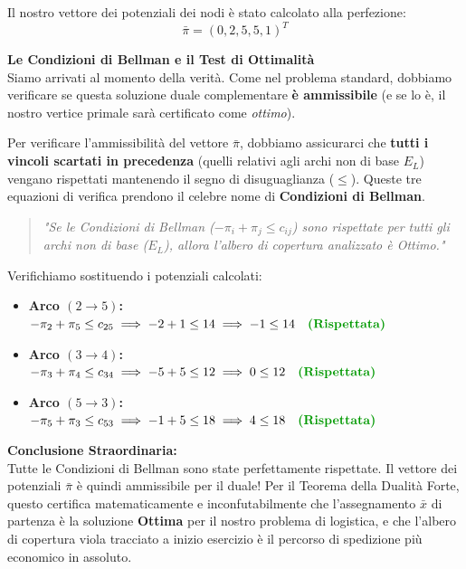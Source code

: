 \documentclass[12pt, a4paper]{article}
\begin{document}
	Il nostro vettore dei potenziali dei nodi è stato calcolato alla perfezione:
	\[ \bar{\pi} = (0, 2, 5, 5, 1)^T \]
	
	\vspace{0.4cm}
	\textbf{Le Condizioni di Bellman e il Test di Ottimalità}\\
	Siamo arrivati al momento della verità. Come nel problema standard, dobbiamo verificare se questa soluzione duale complementare \textbf{è ammissibile} (e se lo è, il nostro vertice primale sarà certificato come \textit{ottimo}).
	
	Per verificare l'ammissibilità del vettore $\bar{\pi}$, dobbiamo assicurarci che \textbf{tutti i vincoli scartati in precedenza} (quelli relativi agli archi non di base $E_L$) vengano rispettati mantenendo il segno di disuguaglianza ($\leq$). Queste tre equazioni di verifica prendono il celebre nome di \textbf{Condizioni di Bellman}.
	\begin{quote}
		\textit{"Se le Condizioni di Bellman ($-\pi_i + \pi_j \leq c_{ij}$) sono rispettate per tutti gli archi non di base ($E_L$), allora l'albero di copertura analizzato è Ottimo."}
	\end{quote}
	
	Verifichiamo sostituendo i potenziali calcolati:
	\begin{itemize}[label=\textcolor{titlecolor}{\Large\textbullet}, itemsep=4pt, leftmargin=1.5cm]
		\item \textbf{Arco $(2\to5)$:} $-\pi_2 + \pi_5 \leq c_{25} \implies -2 + 1 \leq 14 \implies -1 \leq 14 \quad \text{\textcolor{green!60!black}{\textbf{(Rispettata)}}}$
		\item \textbf{Arco $(3\to4)$:} $-\pi_3 + \pi_4 \leq c_{34} \implies -5 + 5 \leq 12 \implies 0 \leq 12 \quad \text{\textcolor{green!60!black}{\textbf{(Rispettata)}}}$
		\item \textbf{Arco $(5\to3)$:} $-\pi_5 + \pi_3 \leq c_{53} \implies -1 + 5 \leq 18 \implies 4 \leq 18 \quad \text{\textcolor{green!60!black}{\textbf{(Rispettata)}}}$
	\end{itemize}
	
	\textbf{Conclusione Straordinaria:}\\
	Tutte le Condizioni di Bellman sono state perfettamente rispettate. Il vettore dei potenziali $\bar{\pi}$ è quindi ammissibile per il duale! Per il Teorema della Dualità Forte, questo certifica matematicamente e inconfutabilmente che l'assegnamento $\bar{x}$ di partenza è la soluzione \textbf{Ottima} per il nostro problema di logistica, e che l'albero di copertura viola tracciato a inizio esercizio è il percorso di spedizione più economico in assoluto. 
	
\end{document}

